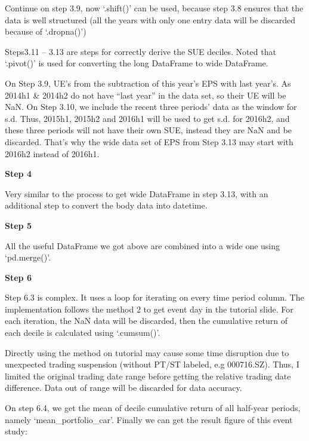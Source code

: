 Continue on step 3.9, now `.shift()' can be used, because step 3.8 ensures that the data is well structured (all the years with only one entry data will be discarded because of `.dropna()')

Steps3.11 -- 3.13 are steps for correctly derive the SUE deciles. Noted that `.pivot()' is used for converting the long DataFrame to wide DataFrame.

\begin{claimbox}
  On Step 3.9, UE's from the subtraction of this year’s EPS with last year’s. As 2014h1 \& 2014h2 do not have ``last year” in the data set, so their UE will be NaN. On Step 3.10, we include the recent three periods’ data as the window for s.d. Thus, 2015h1, 2015h2 and 2016h1 will be used to get s.d. for 2016h2, and these three periods will not have their own SUE, instead they are NaN and be discarded. That's why the wide data set of EPS from Step 3.13 may start with 2016h2 instead of 2016h1.
\end{claimbox}


\noindent
\textbf{Step 4} 

Very similar to the process to get wide DataFrame in step 3.13, with an additional step to convert the body data into datetime. 


\noindent
\textbf{Step 5} 

All the useful DataFrame we got above are combined into a wide one using `pd.merge()'.


\noindent
\textbf{Step 6} 

Step 6.3 is complex. It uses a loop for iterating on every time period column. The implementation follows the method 2 to get event day in the tutorial slide. For each iteration, the NaN data will be discarded, then the cumulative return of each decile is calculated using `.cumsum()'.

\begin{warningbox}
  Directly using the method on tutorial may cause some time disruption due to unexpected trading suspension (without PT/ST labeled, e.g 000716.SZ). Thus, I limited the original trading date range before getting the relative trading date difference. Data out of range will be discarded for data accuracy.
\end{warningbox}

On step 6.4, we get the mean of decile cumulative return of all half-year periods, namely `mean\_portfolio\_car'. Finally we can get the result figure of this event study:


